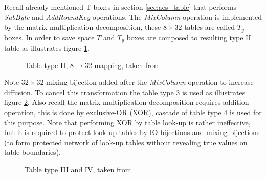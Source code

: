 \documentclass[11pt,oneside,final]{fithesis2}
\begin{document}
    Recall already mentioned T-boxes in section \ref{sec:aes_table} that performs \emph{SubByte} and \emph{AddRoundKey} operations. The \emph{MixColumn} operation 
    is implemented by the matrix multiplication decomposition, these $8\times32$ tables are called $T_y$ boxes. In order to save space
    $T$ and $T_y$ boxes are composed to resulting type II table as illustrates figure \ref{fig:aes_t2}.

    \begin{figure}[!htb]
    \begin{center}
    \leavevmode
    \centerline{}
    \end{center}
    \caption{Table type II, $8\rightarrow32$ mapping, taken from~\citep{wyseurPhd}}
    \label{fig:aes_t2}
    \end{figure}

    Note $32\times32$ mixing bijection added after the \emph{MixColumn} operation to increase diffusion. To cancel this transformation the table 
    type 3 is used as illustrates figure \ref{fig:aes_t3_t4}. Also recall the matrix multiplication decomposition requires addition operation, this is done
    by exclusive-OR (XOR), cascade of table type 4 is used for this purpose. Note that performing XOR by table look-up is rather ineffective, but it is required to 
    protect look-up tables by IO bijections and mixing bijections (to form protected network of look-up tables without revealing true values on 
    table boundaries).
    
    \begin{figure}[!htb]
    \begin{center}
    \leavevmode
    \centerline{}
    \end{center}
    \caption{Table type III and IV, taken from~\citep{wyseurPhd}}
    \label{fig:aes_t3_t4}
    \end{figure}
        
\end{document}
